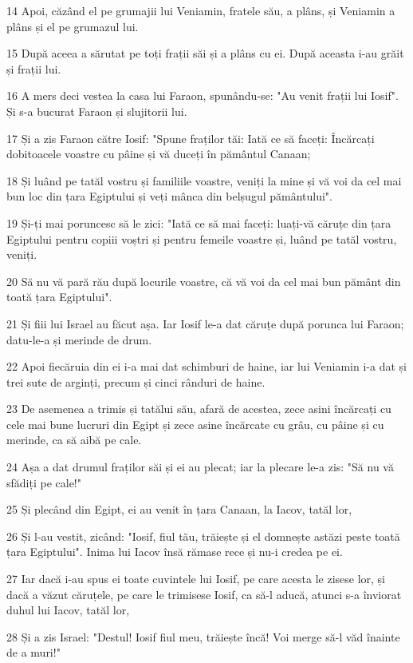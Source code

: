 \par 14 Apoi, căzând el pe grumajii lui Veniamin, fratele său, a plâns, și Veniamin a plâns și el pe grumazul lui.
\par 15 După aceea a sărutat pe toți frații săi și a plâns cu ei. După aceasta i-au grăit și frații lui.
\par 16 A mers deci vestea la casa lui Faraon, spunându-se: "Au venit frații lui Iosif". Și s-a bucurat Faraon și slujitorii lui.
\par 17 Și a zis Faraon către Iosif: "Spune fraților tăi: Iată ce să faceți: Încărcați dobitoacele voastre cu pâine și vă duceți în pământul Canaan;
\par 18 Și luând pe tatăl vostru și familiile voastre, veniți la mine și vă voi da cel mai bun loc din țara Egiptului și veți mânca din belșugul pământului".
\par 19 Și-ți mai poruncesc să le zici: "Iată ce să mai faceți: luați-vă căruțe din țara Egiptului pentru copiii voștri și pentru femeile voastre și, luând pe tatăl vostru, veniți.
\par 20 Să nu vă pară rău după locurile voastre, că vă voi da cel mai bun pământ din toată țara Egiptului".
\par 21 Și fiii lui Israel au făcut așa. Iar Iosif le-a dat căruțe după porunca lui Faraon; datu-le-a și merinde de drum.
\par 22 Apoi fiecăruia din ei i-a mai dat schimburi de haine, iar lui Veniamin i-a dat și trei sute de arginți, precum și cinci rânduri de haine.
\par 23 De asemenea a trimis și tatălui său, afară de acestea, zece asini încărcați cu cele mai bune lucruri din Egipt și zece asine încărcate cu grâu, cu pâine și cu merinde, ca să aibă pe cale.
\par 24 Așa a dat drumul fraților săi și ei au plecat; iar la plecare le-a zis: "Să nu vă sfădiți pe cale!"
\par 25 Și plecând din Egipt, ei au venit în țara Canaan, la Iacov, tatăl lor,
\par 26 Și l-au vestit, zicând: "Iosif, fiul tău, trăiește și el domnește astăzi peste toată țara Egiptului". Inima lui Iacov însă rămase rece și nu-i credea pe ei.
\par 27 Iar dacă i-au spus ei toate cuvintele lui Iosif, pe care acesta le zisese lor, și dacă a văzut căruțele, pe care le trimisese Iosif, ca să-l aducă, atunci s-a înviorat duhul lui Iacov, tatăl lor,
\par 28 Și a zis Israel: "Destul! Iosif fiul meu, trăiește încă! Voi merge să-l văd înainte de a muri!"

